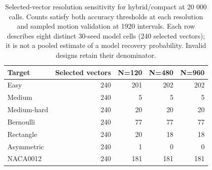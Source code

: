 \begin{table}[H]
\caption{Selected-vector resolution sensitivity for hybrid/compact at 20 000 calls. Counts satisfy both accuracy thresholds at each resolution and sampled motion validation at 1920 intervals. Each row describes eight distinct 30-seed model cells (240 selected vectors); it is not a pooled estimate of a model recovery probability. Invalid designs retain their denominator.}
\label{tab:v2_resolution}
\centering
\small
\begin{tabular}{@{}lrrrr@{}}
\toprule
Target & Selected vectors & N=120 & N=480 & N=960 \\
\midrule
Easy & 240 & 201 & 202 & 202 \\
Medium & 240 & 5 & 5 & 5 \\
Medium-hard & 240 & 20 & 20 & 20 \\
Bernoulli & 240 & 77 & 77 & 77 \\
Rectangle & 240 & 20 & 18 & 18 \\
Asymmetric & 240 & 1 & 0 & 0 \\
NACA0012 & 240 & 181 & 181 & 181 \\
\bottomrule
\end{tabular}
\end{table}
